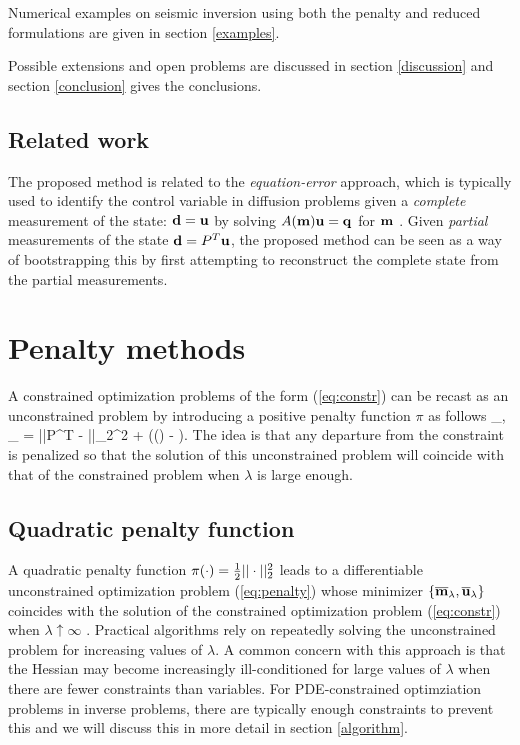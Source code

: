\documentclass{iopart}
\begin{document}
Numerical
examples on seismic inversion using both the penalty and reduced
formulations are given in section \ref{examples}.

Possible extensions and open problems are discussed in section
\ref{discussion} and section \ref{conclusion} gives the conclusions.

\subsection{Related work}
The proposed method is related to the \emph{equation-error} approach,
which is typically used to identify the control variable in diffusion
problems given a \emph{complete} measurement of the state: $\mathbf{d} = \mathbf{u}$ by
solving $A(\mathbf{m})\mathbf{u} = \mathbf{q}$ for $\mathbf{m}$ \cite{Richter1981,Banerjee2013}. 
Given \emph{partial} measurements of the state $\mathbf{d} = P^T\mathbf{u}$, the proposed method can be seen as a
way of bootstrapping this by first attempting to reconstruct the complete
state from the partial measurements. 

\section{Penalty methods}
\label{penalty}
A constrained optimization problems of the form (\ref{eq:constr})
can be recast as an unconstrained problem by introducing a positive penalty function $\pi$ as follows
\bq
\label{eq:penalty}
\min_{,} \Phi_{\lambda} = ||P^T - ||_2^2 + \lambda\pi(() - ).
\eq
The idea is that any departure from the constraint is penalized so that the solution of this 
unconstrained problem will coincide with that of the constrained problem when $\lambda$ is large enough.

\subsection{Quadratic penalty function}
A quadratic penalty function $\pi(\cdot) = {\textstyle\frac{1}{2}}||\cdot||_2^2$ leads to a differentiable 
unconstrained optimization problem (\ref{eq:penalty}) whose minimizer $\{\overline{\mathbf{m}}_{\lambda},\overline{\mathbf{u}}_{\lambda}\}$ coincides with the solution
of the constrained optimization problem (\ref{eq:constr}) when $\lambda \uparrow \infty$ \cite[Thm. 17.1]{Nocedal}. 
Practical algorithms rely on repeatedly solving the unconstrained problem for increasing values of $\lambda$.
A common concern with this approach is that the Hessian may become increasingly ill-conditioned 
for large values of $\lambda$ when there are fewer constraints than variables. For PDE-constrained 
optimziation problems in inverse problems, there are typically enough constraints to prevent this and we will
discuss this in more detail in section \ref{algorithm}.
\end{document}
